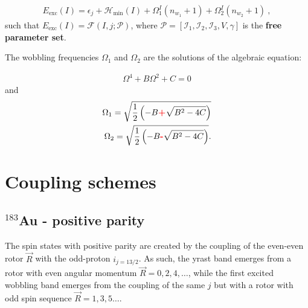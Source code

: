 \documentclass[12pt, a4paper]{article}
\begin{document}
\begin{align}
    E_\text{exc}(I)=\epsilon_j+\mathcal{H}_\text{min}(I)+\Omega_1^I\left(n_{w_1}+1\right)+\Omega_2^I\left(n_{w_2}+1\right)\ ,
\end{align}
such that $E_\text{exc}(I)=\mathcal{F}(I,j;\mathcal{P})$, where $\mathcal{P}=\left[\mathcal{I}_1,\mathcal{I}_2,\mathcal{I}_3,V,\gamma\right]$ is the \textbf{free parameter set}.

The wobbling frequencies $\Omega_1$ and $\Omega_2$ are the solutions of the algebraic equation:

\begin{align}
    \Omega^4+B\Omega^2+C=0
\end{align}
and 
\begin{align}
    \Omega_1=\sqrt{\frac{1}{2}\left(-B{\color{red}\textbf{+}}\sqrt{B^2-4C}\right)}\\
    \Omega_2=\sqrt{\frac{1}{2}\left(-B{\color{red}\textbf{-}}\sqrt{B^2-4C}\right)}.
\end{align}

\section{Coupling schemes}

\subsection{$^{183}$Au - positive parity}

The spin states with positive parity are created by the coupling of the even-even rotor $\vec{R}$ with the odd-proton $i_{j=13/2}$. As such, the yrast band emerges from a rotor with even angular momentum $\vec{R}=0,2,4,\dots$, while the first excited wobbling band emerges from the coupling of the same $j$ but with a rotor with odd spin sequence $\vec{R}=1,3,5\dots$.

\newpage


\end{document}
